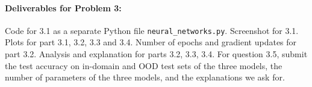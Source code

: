 \noindent \paragraph{Deliverables for Problem 3:}
Code for 3.1 as a separate Python file \texttt{neural\_networks.py}. Screenshot for 3.1. Plots for part 3.1, 3.2, 3.3 and 3.4. Number of epochs and gradient updates for part 3.2. Analysis and explanation for parts 3.2, 3.3, 3.4. For question 3.5, submit the test accuracy on in-domain and OOD test sets of the three models, the number of parameters of the three models, and the explanations we ask for.


